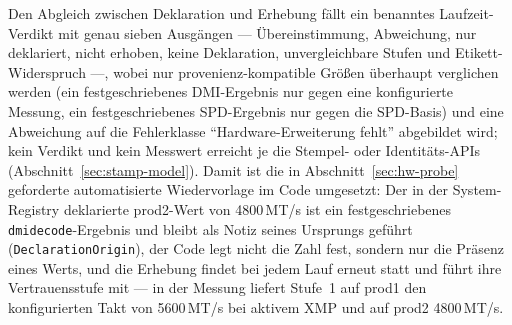 \begin{nurlang}
Den Abgleich zwischen Deklaration und Erhebung fällt ein benanntes Laufzeit-Verdikt mit genau
sieben Ausgängen --- Übereinstimmung, Abweichung, nur deklariert, nicht erhoben, keine
Deklaration, unvergleichbare Stufen und Etikett-Widerspruch ---, wobei nur provenienz-kompatible
Größen überhaupt verglichen werden (ein festgeschriebenes DMI-Ergebnis nur gegen eine konfigurierte Messung,
ein festgeschriebenes SPD-Ergebnis nur gegen die SPD-Basis) und eine Abweichung auf die Fehlerklasse
\enquote{Hardware-Erweiterung fehlt} abgebildet wird; kein Verdikt und kein Messwert erreicht je die
Stempel- oder Identitäts-APIs (Abschnitt~\ref{sec:stamp-model}). Damit ist die in
Abschnitt~\ref{sec:hw-probe} geforderte automatisierte Wiedervorlage im Code umgesetzt: Der in der
System-Registry deklarierte prod2-Wert von 4800\,MT/s ist ein festgeschriebenes \texttt{dmidecode}-Ergebnis
und bleibt als Notiz seines Ursprungs geführt (\texttt{DeclarationOrigin}), der Code legt nicht die Zahl fest,
sondern nur die Präsenz eines Werts, und die Erhebung findet bei jedem Lauf erneut statt und führt ihre
Vertrauensstufe mit --- in der Messung liefert Stufe~1 auf prod1 den konfigurierten Takt von 5600\,MT/s bei
aktivem XMP und auf prod2 4800\,MT/s.
\end{nurlang}

